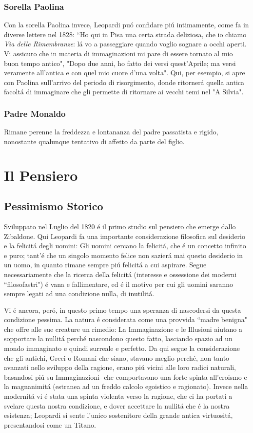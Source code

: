 \documentclass{report}
\begin{document}
\subsubsection{Sorella Paolina}
Con la sorella Paolina invece, Leopardi puó confidare piú intimamente, come fa in diverse lettere nel 1828: ``Ho qui in Pisa una certa strada deliziosa, che io chiamo \emph{Via delle Rimembranze}: lá vo a passeggiare quando voglio sognare a occhi aperti. Vi assicuro che in materia di immaginazioni mi pare di essere tornato al mio buon tempo antico", "Dopo due anni, ho fatto dei versi quest'Aprile; ma versi veramente all'antica e con quel mio cuore d'una volta". Qui, per esempio, si apre con Paolina sull'arrivo del periodo di risorgimento, donde ritornerá quella antica facoltá di immaginare che gli permette di ritornare ai vecchi temi nel "A Silvia".
\subsubsection{Padre Monaldo}
Rimane perenne la freddezza e lontananza del padre passatista e rigido, nonostante qualunque tentativo di affetto da parte del figlio.
\section{Il Pensiero}
\subsection*{Pessimismo Storico}
Sviluppato nel Luglio del 1820 é il primo studio sul pensiero che emerge dallo Zibaldone. Qui Leopardi fa una importante considerazione filosofica sul desiderio e la felicitá degli uomini: Gli uomini cercano la felicitá, che é un concetto infinito e puro; tant'é che un singolo momento felice non sazierá mai  questo desiderio in un uomo, in quanto rimane sempre piú felicitá a cui aspirare. Segue necessariamente che la ricerca della felicitá (interesse e ossessione dei moderni ``filosofastri") é vana e fallimentare, ed é il motivo per cui gli uomini saranno sempre legati ad una condizione nulla, di inutilitá.

Vi é ancora, peró, in questo primo tempo una speranza di nascodersi da questa condizione pessima. La natura é considerata come una provvida ``madre benigna" che offre alle sue creature un rimedio: La Immaginazione e le Illusioni aiutano a sopportare la nullitá perché nascondono questo fatto, lasciando spazio ad un mondo immaginato e quindi surreale e perfetto. Da qui segue la considerazione che gli antichi, Greci o Romani che siano, stavano meglio perché, non tanto avanzati nello sviluppo della ragione, erano piú vicini alle loro radici naturali, basandosi piú su Immaginazioni- che comportavano una forte spinta all'eroismo e la magnanimitá (estranea ad un freddo calcolo egoistico e ragionato). Invece nella modernitá vi é stata una spinta violenta verso la ragione, che ci ha portati a svelare questa nostra condizione, e dover accettare la nullitá che é la nostra esistenza; Leopardi si sente l'unico sostenitore della grande antica virtuositá, presentandosi come un Titano.
\end{document}
